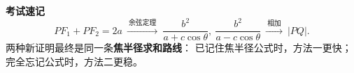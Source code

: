 \begin{proofbox}
    \medskip
    \textbf{\textcolor{CProof}{考试速记}}
    \[
        PF_1+PF_2=2a
        \ \xrightarrow{\ \text{余弦定理}\ }
        \ \frac{b^2}{a+c\cos\theta},\ \frac{b^2}{a-c\cos\theta}
        \ \xrightarrow{\ \text{相加}\ }\ |PQ|.
    \]
    两种新证明最终是同一条\textbf{焦半径求和路线}：
    已记住焦半径公式时，方法一更快；完全忘记公式时，方法二更稳。
\end{proofbox}
